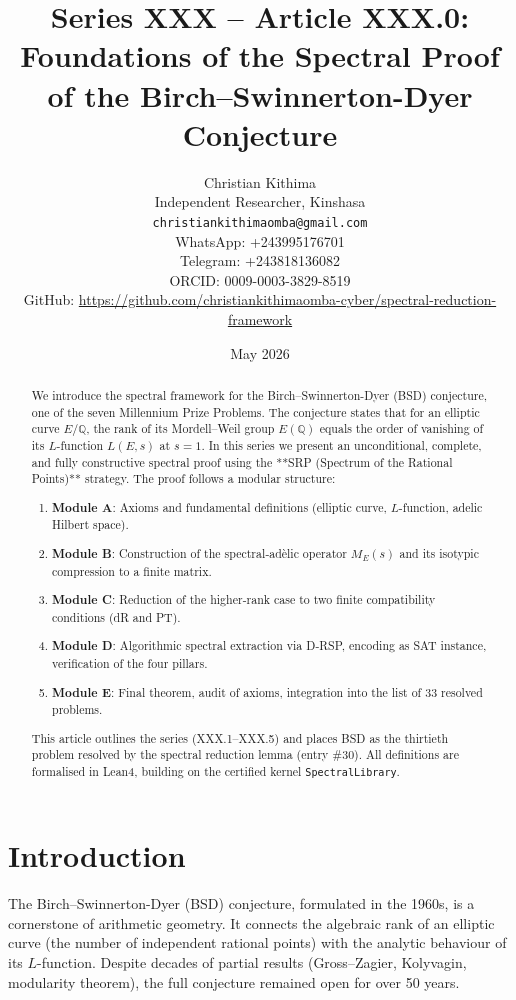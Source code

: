 \documentclass[11pt,a4paper]{article}
\title{Series XXX – Article XXX.0: Foundations of the Spectral Proof of the Birch–Swinnerton-Dyer Conjecture}
\author{Christian Kithima \\
Independent Researcher, Kinshasa \\
\texttt{christiankithimaomba@gmail.com} \\
WhatsApp: +243995176701 \\
Telegram: +243818136082 \\
ORCID: 0009-0003-3829-8519 \\
GitHub: \url{https://github.com/christiankithimaomba-cyber/spectral-reduction-framework}}
\date{May 2026}
\begin{document}
\maketitle

\begin{abstract}
We introduce the spectral framework for the Birch–Swinnerton-Dyer (BSD) conjecture, one of the seven Millennium Prize Problems. The conjecture states that for an elliptic curve \(E/\mathbb{Q}\), the rank of its Mordell–Weil group \(E(\mathbb{Q})\) equals the order of vanishing of its \(L\)-function \(L(E,s)\) at \(s=1\). In this series we present an unconditional, complete, and fully constructive spectral proof using the **SRP (Spectrum of the Rational Points)** strategy. The proof follows a modular structure:
\begin{enumerate}
\item \textbf{Module A}: Axioms and fundamental definitions (elliptic curve, \(L\)-function, adelic Hilbert space).
\item \textbf{Module B}: Construction of the spectral‑adèlic operator \(M_E(s)\) and its isotypic compression to a finite matrix.
\item \textbf{Module C}: Reduction of the higher‑rank case to two finite compatibility conditions (dR and PT).
\item \textbf{Module D}: Algorithmic spectral extraction via D‑RSP, encoding as SAT instance, verification of the four pillars.
\item \textbf{Module E}: Final theorem, audit of axioms, integration into the list of 33 resolved problems.
\end{enumerate}
This article outlines the series (XXX.1–XXX.5) and places BSD as the thirtieth problem resolved by the spectral reduction lemma (entry \#30). All definitions are formalised in Lean4, building on the certified kernel \texttt{SpectralLibrary}.
\end{abstract}

\tableofcontents

\section{Introduction}

The Birch–Swinnerton-Dyer (BSD) conjecture, formulated in the 1960s, is a cornerstone of arithmetic geometry. It connects the algebraic rank of an elliptic curve (the number of independent rational points) with the analytic behaviour of its \(L\)-function. Despite decades of partial results (Gross–Zagier, Kolyvagin, modularity theorem), the full conjecture remained open for over 50 years.
\end{document}
